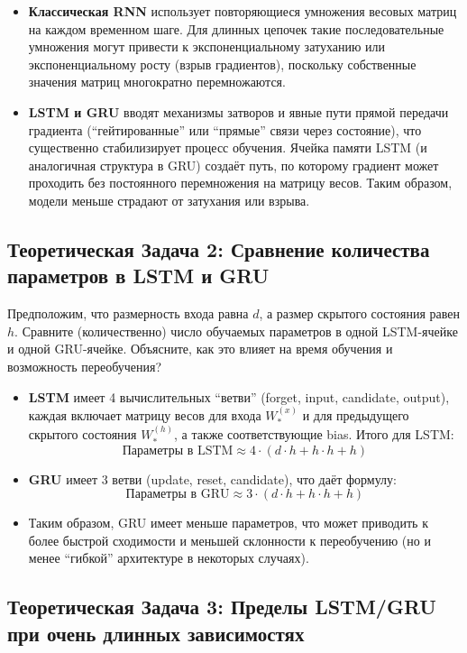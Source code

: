 \begin{itemize}
    \item \textbf{Классическая RNN} использует повторяющиеся умножения весовых матриц на каждом временном шаге. Для длинных цепочек такие последовательные умножения могут привести к экспоненциальному затуханию или экспоненциальному росту (взрыв градиентов), поскольку собственные значения матриц многократно перемножаются.
    \item \textbf{LSTM и GRU} вводят механизмы затворов и явные пути прямой передачи градиента (``гейтированные'' или ``прямые'' связи через состояние), что существенно стабилизирует процесс обучения. Ячейка памяти LSTM (и аналогичная структура в GRU) создаёт путь, по которому градиент может проходить без постоянного перемножения на матрицу весов. Таким образом, модели меньше страдают от затухания или взрыва.
\end{itemize}

\subsection{Теоретическая Задача 2: Сравнение количества параметров в LSTM и GRU}
Предположим, что размерность входа равна $d$, а размер скрытого состояния равен $h$. Сравните (количественно) число обучаемых параметров в одной LSTM-ячейке и одной GRU-ячейке. Объясните, как это влияет на время обучения и возможность переобучения?

\begin{itemize}
    \item \textbf{LSTM} имеет 4 вычислительных ``ветви'' (forget, input, candidate, output), каждая включает матрицу весов для входа $W_{*}^{(x)}$ и для предыдущего скрытого состояния $W_{*}^{(h)}$, а также соответствующие bias. Итого для LSTM:
    \[
    \text{Параметры в LSTM} \approx 4 \cdot (d \cdot h + h \cdot h + h)
    \]
    \item \textbf{GRU} имеет 3 ветви (update, reset, candidate), что даёт формулу:
    \[
    \text{Параметры в GRU} \approx 3 \cdot (d \cdot h + h \cdot h + h)
    \]
    \item Таким образом, GRU имеет меньше параметров, что может приводить к более быстрой сходимости и меньшей склонности к переобучению (но и менее ``гибкой'' архитектуре в некоторых случаях).
\end{itemize}

\subsection{Теоретическая Задача 3: Пределы LSTM/GRU при очень длинных зависимостях}

